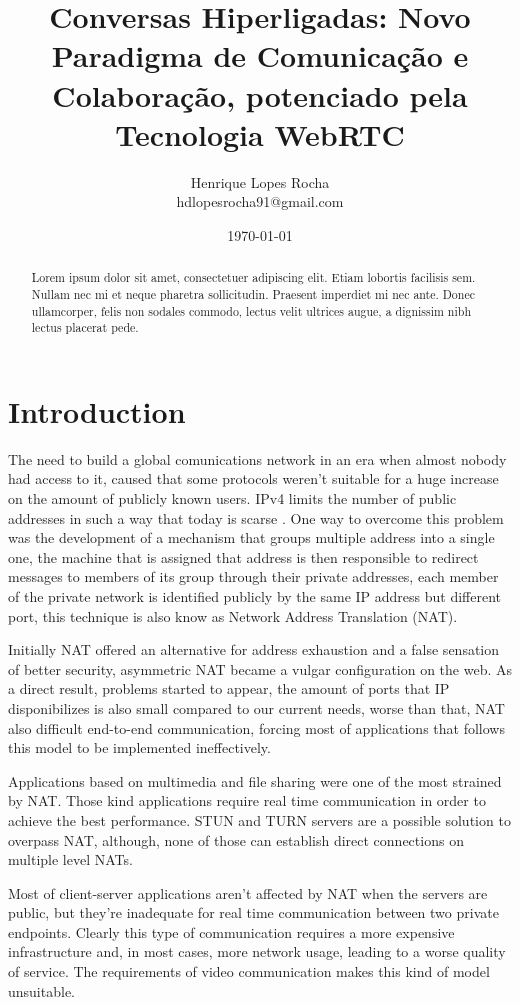 \documentclass[11pt,twocolumn]{article}
\title{Conversas Hiperligadas: Novo Paradigma de Comunicação e Colaboração, potenciado pela Tecnologia WebRTC}
\author{
	Henrique Lopes Rocha \\ hdlopesrocha91@gmail.com
}
\date{\today}
\begin{document}
\begingroup
\let\onecolumn\twocolumn

	\maketitle


\begin{abstract}
Lorem ipsum dolor sit amet, consectetuer adipiscing elit. Etiam lobortis facilisis sem. Nullam nec mi et neque pharetra sollicitudin. Praesent imperdiet mi nec ante. Donec ullamcorper, felis non sodales commodo, lectus velit ultrices augue, a dignissim nibh lectus placerat pede.
\end{abstract}

\endgroup


\section{Introduction}
The need to build a global comunications network in an era when almost nobody had access to it, caused that some protocols weren't suitable for a huge increase on the amount of publicly known users. IPv4 limits the number of public addresses in such a way that today is scarse \cite{ipv4}. One way to overcome this problem was the development of a mechanism that groups multiple address into a single one, the machine that is assigned that address is then responsible to redirect messages to members of its group through their private addresses, each member of the private network is identified publicly by the same IP address but different port, this technique is also know as Network Address Translation (NAT).

Initially NAT offered an alternative for address exhaustion and a false sensation of better security, asymmetric NAT became a vulgar configuration on the web. As a direct result, problems started to appear, the amount of ports that IP disponibilizes is also small compared to our current needs, worse than that, NAT also difficult end-to-end communication, forcing most of applications that follows this model to be implemented ineffectively.

Applications based on multimedia and file sharing were one of the most strained by NAT. Those kind applications require real time communication in order to achieve the best performance. STUN and TURN \cite{natvoip} servers are a possible solution to overpass NAT, although, none of those can establish direct connections on multiple level NATs.

Most of client-server applications aren't affected by NAT when the servers are public, but they're inadequate for real time communication between two private endpoints. Clearly this type of communication requires a more expensive infrastructure and, in most cases, more network usage, leading to a worse quality of service. The requirements of video communication makes this kind of model unsuitable.
\end{document}
